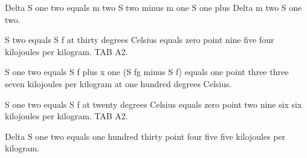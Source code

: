 Delta S one two equals m two S two minus m one S one plus Delta m two S one two.

S two equals S f at thirty degrees Celsius equals zero point nine five four kilojoules per kilogram. TAB A2.

S one two equals S f plus x one (S fg minus S f) equals one point three three seven kilojoules per kilogram at one hundred degrees Celsius.

S one two equals S f at twenty degrees Celsius equals zero point two nine six six kilojoules per kilogram. TAB A2.

Delta S one two equals one hundred thirty point four five five kilojoules per kilogram.